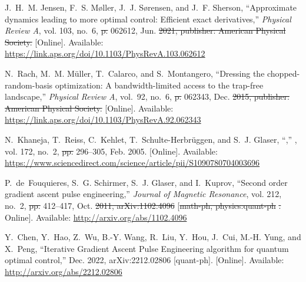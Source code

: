 \documentclass[a4paper,oneside,11pt]{book}
\providecommand{\DIFaddtex}[1]{{\protect\color{blue}\uwave{#1}}} %
\providecommand{\DIFdeltex}[1]{{\protect\color{red}\sout{#1}}}                      %
\providecommand{\DIFaddbegin}{} %
\providecommand{\DIFaddend}{} %
\providecommand{\DIFdelbegin}{} %
\providecommand{\DIFdelend}{} %
\providecommand{\DIFadd}[1]{\texorpdfstring{\DIFaddtex{#1}}{#1}} %
\providecommand{\DIFdel}[1]{\texorpdfstring{\DIFdeltex{#1}}{}} %
\newcommand{\DIFscaledelfig}{0.5}
\newlength{\DIFdelgraphicswidth} %
\newlength{\DIFdelgraphicsheight} %
\newcommand{\DIFaddincludegraphics}[2][]{{\color{blue}\fbox{\DIFOincludegraphics[#1]{#2}}}} %
\newcommand{\DIFdelincludegraphics}[2][]{%
\sbox{\DIFdelgraphicsbox}{\DIFOincludegraphics[#1]{#2}}%
\settoboxwidth{\DIFdelgraphicswidth}{\DIFdelgraphicsbox} %
\settoboxtotalheight{\DIFdelgraphicsheight}{\DIFdelgraphicsbox} %
\scalebox{\DIFscaledelfig}{%
\parbox[b]{\DIFdelgraphicswidth}{\usebox{\DIFdelgraphicsbox}\\[-\baselineskip] \rule{\DIFdelgraphicswidth}{0em}}\llap{\resizebox{\DIFdelgraphicswidth}{\DIFdelgraphicsheight}{%
\setlength{\unitlength}{\DIFdelgraphicswidth}%
\begin{picture}(1,1)%
\thicklines\linethickness{2pt} %
{\color[rgb]{1,0,0}\put(0,0){\framebox(1,1){}}}%
{\color[rgb]{1,0,0}\put(0,0){\line( 1,1){1}}}%
{\color[rgb]{1,0,0}\put(0,1){\line(1,-1){1}}}%
\end{picture}%
}\hspace*{3pt}}} %
} %
\DeclareRobustCommand{\DIFaddbegin}{\DIFOaddbegin \let\includegraphics\DIFaddincludegraphics} %
\DeclareRobustCommand{\DIFaddend}{\DIFOaddend \let\includegraphics\DIFOincludegraphics} %
\DeclareRobustCommand{\DIFdelbegin}{\DIFOdelbegin \let\includegraphics\DIFdelincludegraphics} %
\DeclareRobustCommand{\DIFdelend}{\DIFOaddend \let\includegraphics\DIFOincludegraphics} %
\begin{document}
\begin{thebibliography}{100}
\BIBentryALTinterwordspacing
J.~H.~M. Jensen, F.~S. Møller, J.~J. Sørensen, and J.~F. Sherson,
  ``Approximate dynamics leading to more optimal control: {Efficient} exact
  derivatives,'' \emph{Physical Review A}, vol. 103, no.~6,  \DIFdelbegin \DIFdel{p. }\DIFdelend 062612, Jun. \DIFdelbegin \DIFdel{2021, publisher: American Physical Society. }\DIFdelend \DIFaddbegin \DIFadd{2021.
  }\DIFaddend [Online]. Available:
  \url{https://link.aps.org/doi/10.1103/PhysRevA.103.062612}
\BIBentrySTDinterwordspacing

\BIBentryALTinterwordspacing
N.~Rach, M.~M. Müller, T.~Calarco, and S.~Montangero, ``Dressing the
  chopped-random-basis optimization: {A} bandwidth-limited access to the
  trap-free landscape,'' \emph{Physical Review A}, vol.~92, no.~6,  \DIFdelbegin \DIFdel{p. }\DIFdelend 062343,
  Dec. \DIFdelbegin \DIFdel{2015, publisher: American Physical Society. }\DIFdelend \DIFaddbegin \DIFadd{2015. }\DIFaddend [Online]. Available:
  \url{https://link.aps.org/doi/10.1103/PhysRevA.92.062343}
\BIBentrySTDinterwordspacing

\BIBentryALTinterwordspacing
N.~Khaneja, T.~Reiss, C.~Kehlet, T.~Schulte-Herbrüggen, and S.~J. Glaser,
  ``,''
  \emph{}, vol. 172,
  no.~2,  \DIFdelbegin \DIFdel{pp. }\DIFdelend 296--305, Feb. 2005. [Online]. Available:
  \url{https://www.sciencedirect.com/science/article/pii/S1090780704003696}
\BIBentrySTDinterwordspacing

\BIBentryALTinterwordspacing
P.~de~Fouquieres, S.~G. Schirmer, S.~J. Glaser, and I.~Kuprov, ``Second order
  gradient ascent pulse engineering,'' \emph{Journal of Magnetic Resonance},
  vol. 212, no.~2,  \DIFdelbegin \DIFdel{pp. }\DIFdelend 412--417, Oct. \DIFdelbegin \DIFdel{2011, arXiv:1102.4096 }\DIFdelend \DIFaddbegin \DIFadd{2011. }\DIFaddend [\DIFdelbegin \DIFdel{math-ph,
  physics:quant-ph}%
\DIFdel{. }%
\DIFdelend Online]. Available:
  \url{http://arxiv.org/abs/1102.4096}
\BIBentrySTDinterwordspacing

\BIBentryALTinterwordspacing
Y.~Chen, Y.~Hao, Z.~Wu, B.-Y. Wang, R.~Liu, Y.~Hou, J.~Cui, M.-H. Yung, and
  X.~Peng, ``Iterative {Gradient} {Ascent} {Pulse} {Engineering} algorithm for
  quantum optimal control,'' Dec. 2022, arXiv:2212.02806 [quant-ph]. [Online].
  Available: \url{http://arxiv.org/abs/2212.02806}
\BIBentrySTDinterwordspacing


\end{thebibliography}
\end{document}
